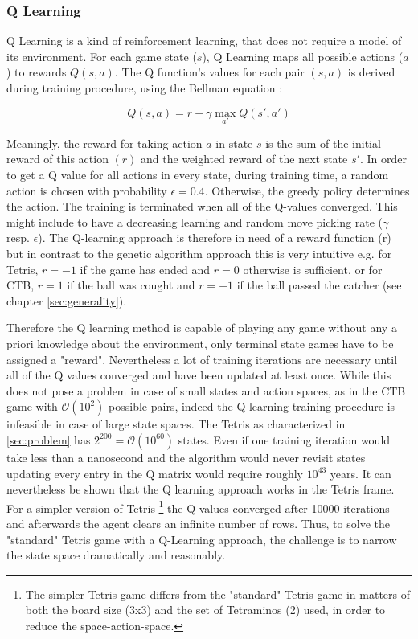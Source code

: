\subsubsection{Q Learning}
Q Learning is a kind of reinforcement learning, that does not require a model of its environment. For each game state ($s$), Q Learning maps all possible actions ($a$) to rewards $Q(s,a) $. The Q function's values for each pair $(s,a)$ is derived during training procedure, using the Bellman equation \cite{qlearning}: 

$$Q(s,a) = r + \gamma \max_{a'} Q(s', a')$$

Meaningly, the reward for taking action $a$ in state $s$ is the sum of the initial reward of this action $(r)$ and the weighted reward of the next state $s'$. In order to get a Q value for all actions in every state, during training time, a random action is chosen with probability $\epsilon = 0.4$. Otherwise, the greedy policy determines the action. The training is terminated when all of the Q-values converged. This might include to have a decreasing learning and random move picking rate ($\gamma$ resp. $\epsilon$). 
\newline
The Q-learning approach is therefore in need of a reward function (r) but in contrast to the genetic algorithm approach this is very intuitive e.g. for Tetris, $r=-1$ if the game has ended and $r=0$ otherwise is sufficient, or for CTB, $r=1$ if the ball was cought and $r=-1$ if the ball passed the catcher (see chapter \ref{sec:generality}). 

\vspace{0.25cm}

Therefore the Q learning method is capable of playing any game without any a priori knowledge about the environment, only terminal state games have to be assigned a "reward". Nevertheless a lot of training iterations are necessary until all of the Q values converged and have been updated at least once. While this does not pose a problem in case of small states and action spaces, as in the CTB game with $\mathcal{O}(10^2)$ possible pairs, indeed the Q learning training procedure is infeasible in case of large state spaces. The Tetris as characterized in \ref{sec:problem} has $2^{200} = \mathcal{O}(10^{60})$ states. Even if one training iteration would take less than a nanosecond and the algorithm would never revisit states updating every entry in the Q matrix would require roughly $10^{43}$ years. It can nevertheless be shown that the Q learning approach works in the Tetris frame. For a simpler version of Tetris \footnote{The simpler Tetris game differs from the "standard" Tetris game in matters of both the board size (3x3) and the set of Tetraminos (2) used, in order to reduce the space-action-space.} the Q values converged after 10000 iterations and afterwards the agent clears an infinite number of rows. Thus, to solve the "standard" Tetris game with a Q-Learning approach, the challenge is to narrow the state space dramatically and reasonably. 

